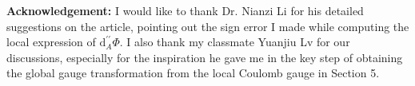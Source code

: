 \documentclass[a4paper]{amsart}
\theoremstyle{definition}
\theoremstyle{remark}
\numberwithin{equation}{section}
\begin{document}
\noindent\textbf{Acknowledgement:}
I would like to thank Dr. Nianzi Li for his detailed suggestions on the article, pointing out the sign error I made while computing the local expression of $\text{d}_{A}^{\prime\prime}\Phi$. I also thank my classmate Yuanjiu Lv for our discussions, especially for the inspiration he gave me in the key step of obtaining the global gauge transformation from the local Coulomb gauge in Section 5.




\end{document}
